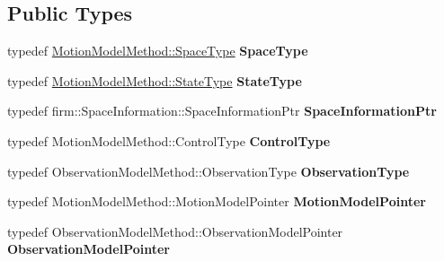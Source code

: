 \subsection*{\-Public \-Types}
\begin{DoxyCompactItemize}
\item 
\hypertarget{class_controller_aa08894881f64205d60cf7569370af8e1}{typedef \*
\hyperlink{class_s_e2_belief_space}{\-Motion\-Model\-Method\-::\-Space\-Type} {\bfseries \-Space\-Type}}\label{class_controller_aa08894881f64205d60cf7569370af8e1}

\item 
\hypertarget{class_controller_a8fc267f97b0a2a3e1c2b97d791805b5c}{typedef \*
\hyperlink{class_s_e2_belief_space_1_1_state_type}{\-Motion\-Model\-Method\-::\-State\-Type} {\bfseries \-State\-Type}}\label{class_controller_a8fc267f97b0a2a3e1c2b97d791805b5c}

\item 
\hypertarget{class_controller_a0ae807c4f455600c8ca827b816bbd40d}{typedef \*
firm\-::\-Space\-Information\-::\-Space\-Information\-Ptr {\bfseries \-Space\-Information\-Ptr}}\label{class_controller_a0ae807c4f455600c8ca827b816bbd40d}

\item 
\hypertarget{class_controller_ab388284a58474044cc503e876cf0bc7f}{typedef \*
\-Motion\-Model\-Method\-::\-Control\-Type {\bfseries \-Control\-Type}}\label{class_controller_ab388284a58474044cc503e876cf0bc7f}

\item 
\hypertarget{class_controller_a734aecb1a1538fb2154f238796b26d0d}{typedef \*
\-Observation\-Model\-Method\-::\-Observation\-Type {\bfseries \-Observation\-Type}}\label{class_controller_a734aecb1a1538fb2154f238796b26d0d}

\item 
\hypertarget{class_controller_a5b6a5e6d71e96c200e57a52542a4a493}{typedef \*
\-Motion\-Model\-Method\-::\-Motion\-Model\-Pointer {\bfseries \-Motion\-Model\-Pointer}}\label{class_controller_a5b6a5e6d71e96c200e57a52542a4a493}

\item 
\hypertarget{class_controller_a3c4329f9c227302f331c3c2b78cda5d7}{typedef \*
\-Observation\-Model\-Method\-::\-Observation\-Model\-Pointer {\bfseries \-Observation\-Model\-Pointer}}\label{class_controller_a3c4329f9c227302f331c3c2b78cda5d7}

\end{DoxyCompactItemize}
